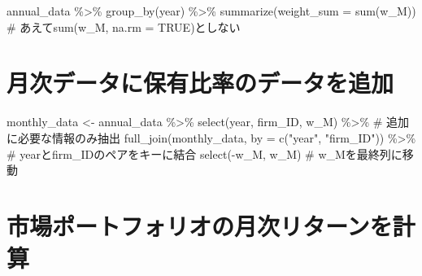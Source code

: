 \documentclass[
  letterpaper,
  DIV=11,
  numbers=noendperiod]{scrreprt}
\newenvironment{Shaded}{\begin{snugshade}}{\end{snugshade}}
\newcommand{\AttributeTok}[1]{\textcolor[rgb]{0.40,0.45,0.13}{#1}}
\newcommand{\CommentTok}[1]{\textcolor[rgb]{0.37,0.37,0.37}{#1}}
\newcommand{\FunctionTok}[1]{\textcolor[rgb]{0.28,0.35,0.67}{#1}}
\newcommand{\NormalTok}[1]{\textcolor[rgb]{0.00,0.23,0.31}{#1}}
\newcommand{\OtherTok}[1]{\textcolor[rgb]{0.00,0.23,0.31}{#1}}
\newcommand{\SpecialCharTok}[1]{\textcolor[rgb]{0.37,0.37,0.37}{#1}}
\newcommand{\StringTok}[1]{\textcolor[rgb]{0.13,0.47,0.30}{#1}}
\begin{document}
\begin{Shaded}
\begin{Highlighting}[]
\NormalTok{annual\_data }\SpecialCharTok{\%\textgreater{}\%} 
  \FunctionTok{group\_by}\NormalTok{(year) }\SpecialCharTok{\%\textgreater{}\%} 
  \FunctionTok{summarize}\NormalTok{(}\AttributeTok{weight\_sum =} \FunctionTok{sum}\NormalTok{(w\_M)) }\CommentTok{\# あえてsum(w\_M, na.rm = TRUE)としない}
\end{Highlighting}
\end{Shaded}

\section{月次データに保有比率のデータを追加}\label{ux6708ux6b21ux30c7ux30fcux30bfux306bux4fddux6709ux6bd4ux7387ux306eux30c7ux30fcux30bfux3092ux8ffdux52a0}

\begin{Shaded}
\begin{Highlighting}[]
\NormalTok{monthly\_data }\OtherTok{\textless{}{-}}\NormalTok{ annual\_data }\SpecialCharTok{\%\textgreater{}\%} 
  \FunctionTok{select}\NormalTok{(year, firm\_ID, w\_M) }\SpecialCharTok{\%\textgreater{}\%} \CommentTok{\# 追加に必要な情報のみ抽出}
  \FunctionTok{full\_join}\NormalTok{(monthly\_data, }\AttributeTok{by =} \FunctionTok{c}\NormalTok{(}\StringTok{"year"}\NormalTok{, }\StringTok{"firm\_ID"}\NormalTok{)) }\SpecialCharTok{\%\textgreater{}\%} \CommentTok{\# yearとfirm\_IDのペアをキーに結合}
  \FunctionTok{select}\NormalTok{(}\SpecialCharTok{{-}}\NormalTok{w\_M, w\_M) }\CommentTok{\# w\_Mを最終列に移動}
\end{Highlighting}
\end{Shaded}

\section{市場ポートフォリオの月次リターンを計算}\label{ux5e02ux5834ux30ddux30fcux30c8ux30d5ux30a9ux30eaux30aaux306eux6708ux6b21ux30eaux30bfux30fcux30f3ux3092ux8a08ux7b97}
\end{document}
